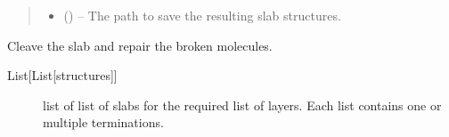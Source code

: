 \documentclass[letterpaper,10pt,english,openany,oneside]{sphinxmanual}
\begin{document}
\begin{fulllineitems}
\begin{quote}
\begin{description}
\begin{itemize}
\item {} 
 () -- The path to save the resulting slab structures.

\end{itemize}

\end{description}\end{quote}

\begin{fulllineitems}
\label{\detokenize{index:ogre.generators.OrganicSlabGenerator.cleave}}
Cleave the slab and repair the broken molecules.
\begin{description}
\item[{List{[}List{[}structures{]}{]}}] \leavevmode
list of list of slabs for the required list of layers. Each list
contains one or multiple terminations.

\end{description}

\end{fulllineitems}


\end{fulllineitems}

\end{document}

